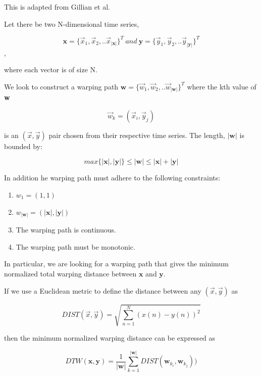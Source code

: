 \documentclass[12pt]{article}
\begin{document}
\begin{enumerate}
This is adapted from Gillian et al.

\vspace{5mm}

Let there be two N-dimensional time series, 

$$  \textbf{x} = \{ \vec{x}_1 ,  \vec{x}_2, ..  \vec{x}_{|\textbf{x}|} \}^T \   and \   \textbf{y} = \{    \vec{y}_1 ,  \vec{y}_2, ..  \vec{y}_{|\textbf{y}|}      \}^T $$, 

where each vector is of size N. 

We look to construct a warping path $ \textbf{w} = \{    \vec{w}_1 ,  \vec{w}_2, ..  \vec{w}_{|\textbf{w}|}      \}^T$ where the kth value of \textbf{w} 

$$ \vec{w}_k = ( \vec{x}_i , \vec{y}_j ) $$

is an $(\vec{x},\vec{y})$ pair chosen from their respective time series. The length, $ | \textbf{w} | $ is bounded by:

$$ max \{ | \textbf{x} |, | \textbf{y} | \} \leq | \textbf{w} | \leq | \textbf{x} | + | \textbf{y} | $$


In addition he warping path must adhere to the following constraints:

\begin{enumerate}

\item $w_1 = (1,1) $

\item $ w_{ | \textbf{w} |} =  ( | \textbf{x} |, | \textbf{y} | ) $

\item The warping path is continuous.

\item The warping path must be monotonic.

\end{enumerate}


In particular, we are looking for a warping path that gives the minimum normalized total warping distance between $ \textbf{x} $ and $ \textbf{y} $.

If we use a Euclidean metric to define the distance between any $ (\vec{x}, \vec{y}) $ as 

$$ DIST(\vec{x}, \vec{y}) = \sqrt{ \displaystyle \sum_{n=1}^N ( x(n) - y(n))^2 } $$

then the minimum normalized warping distance can be expressed as

$$ DTW( \textbf{x}, \textbf{y}) = \frac{1}{ | \textbf{w} | } \displaystyle \sum_{k=1}^{| \textbf{w} | }  DIST( \textbf{w}_{k_i},  \textbf{w}_{k_j} )) $$



\end{enumerate}
\end{document}
